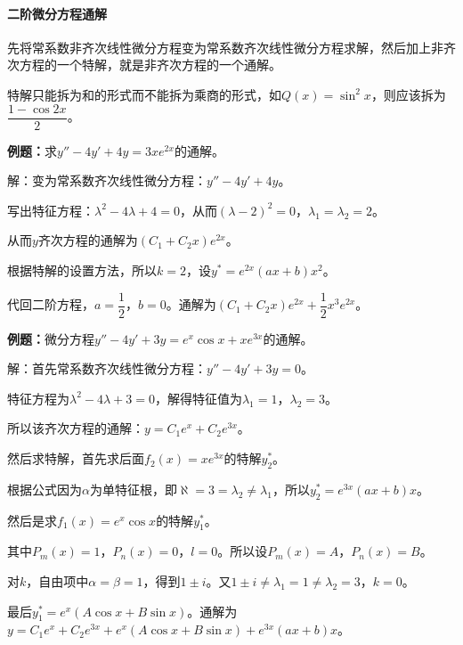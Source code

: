 

\paragraph{二阶微分方程通解}

先将常系数非齐次线性微分方程变为常系数齐次线性微分方程求解，然后加上非齐次方程的一个特解，就是非齐次方程的一个通解。

特解只能拆为和的形式而不能拆为乘商的形式，如$Q(x)=\sin^2x$，则应该拆为$\dfrac{1-\cos2x}{2}$。

\textbf{例题：}求$y''-4y'+4y=3xe^{2x}$的通解。

解：变为常系数齐次线性微分方程：$y''-4y'+4y$。

写出特征方程：$\lambda^2-4\lambda+4=0$，从而$(\lambda-2)^2=0$，$\lambda_1=\lambda_2=2$。

从而$y$齐次方程的通解为$(C_1+C_2x)e^{2x}$。

根据特解的设置方法，所以$k=2$，设$y^*=e^{2x}(ax+b)x^2$。

代回二阶方程，$a=\dfrac{1}{2}$，$b=0$。通解为$(C_1+C_2x)e^{2x}+\dfrac{1}{2}x^3e^{2x}$。

\textbf{例题：}微分方程$y''-4y'+3y=e^x\cos x+xe^{3x}$的通解。

解：首先常系数齐次线性微分方程：$y''-4y'+3y=0$。

特征方程为$\lambda^2-4\lambda+3=0$，解得特征值为$\lambda_1=1$，$\lambda_2=3$。

所以该齐次方程的通解：$y=C_1e^x+C_2e^{3x}$。

然后求特解，首先求后面$f_2(x)=xe^{3x}$的特解$y_2^*$。

根据公式因为$\alpha$为单特征根，即$\aleph=3=\lambda_2\neq\lambda_1$，所以$y_2^*=e^{3x}(ax+b)x$。

然后是求$f_1(x)=e^x\cos x$的特解$y_1^*$。

其中$P_m(x)=1$，$P_n(x)=0$，$l=0$。所以设$P_m(x)=A$，$P_n(x)=B$。

对$k$，自由项中$\alpha=\beta=1$，得到$1\pm i$。又$1\pm i\neq\lambda_1=1\neq\lambda_2=3$，$k=0$。

最后$y_1^*=e^x(A\cos x+B\sin x)$。通解为$y=C_1e^x+C_2e^{3x}+e^x(A\cos x+B\sin x)+e^{3x}(ax+b)x$。


